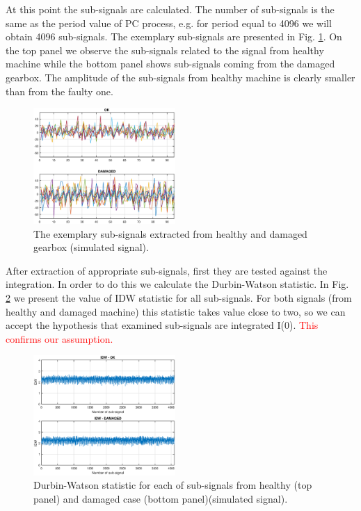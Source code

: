 \documentclass[preprint]{elsarticle}
\begin{document}
At this point the sub-signals are calculated. The number of sub-signals is the same as the period value of PC process, e.g. for period equal to 4096 we will obtain 4096 sub-signals. The exemplary sub-signals are presented in Fig. \ref{fig:simulated_subsignals}. On the top panel we observe the sub-signals related to the signal from healthy machine while the bottom panel shows sub-signals  coming from the damaged gearbox. The amplitude of the sub-signals from healthy machine  is clearly smaller than from the faulty one. 


\begin{figure}[ht!]
\centering
\includegraphics[width=0.48\textwidth]{wykresy/simulated_subsignals.eps}
\caption{The exemplary sub-signals extracted from healthy and damaged gearbox (simulated signal).}
\label{fig:simulated_subsignals}
\end{figure}

After extraction of appropriate sub-signals, first they are tested against the integration. In order to do this we calculate the Durbin-Watson statistic. In Fig. \ref{fig:simulated_IDW} we present the value of IDW statistic for all sub-signals. For both signals (from healthy and damaged machine) this statistic takes value close to two, so we can accept the hypothesis that  examined sub-signals are integrated I(0). \textcolor{red}{This confirms our assumption.}

\begin{figure}[ht!]
\centering
\includegraphics[width=0.48\textwidth]{wykresy/simulated_IDW.eps}
\caption{Durbin-Watson statistic for each of sub-signals from healthy (top panel) and damaged case (bottom panel)(simulated signal).}
\label{fig:simulated_IDW}
\end{figure}
\end{document}

